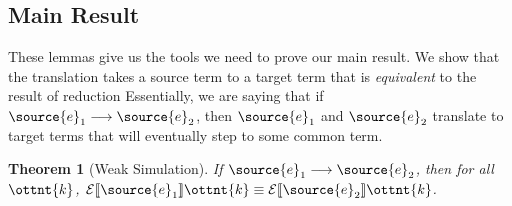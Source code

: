 \documentclass[11pt]{article}
\newtheorem{theorem}{Theorem}[section]
\begin{document}
\subsection{Main Result}

These lemmas give us the tools we need to prove our main result.
We show that the translation takes a source term to a target term
that is \textit{equivalent} to the result of reduction 
Essentially, we are saying that if $\source{e}_{{\mathrm{1}}}  \longrightarrow  \source{e}_{{\mathrm{2}}}$, then $\source{e}_{{\mathrm{1}}}$ and $\source{e}_{{\mathrm{2}}}$
translate to target terms that will eventually step to some common term.

\begin{theorem}[Weak Simulation]

	If $\source{e}_{{\mathrm{1}}}  \longrightarrow  \source{e}_{{\mathrm{2}}}$, then for all $\ottnt{k}$, $ \mathcal{E}\llbracket  \source{e}_{{\mathrm{1}}}  \rrbracket  \ottnt{k}  \equiv   \mathcal{E}\llbracket  \source{e}_{{\mathrm{2}}}  \rrbracket  \ottnt{k} $.

\end{theorem}
\end{document}
